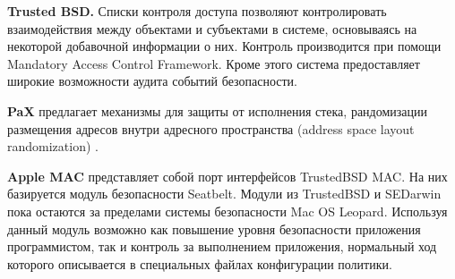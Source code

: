 \bigskip
{\bfseries Trusted BSD.} Списки контроля доступа позволяют 
контролировать взаимодействия между объектами и субъектами
в системе, основываясь на некоторой добавочной информации 
о них. Контроль производится при помощи Mandatory Access 
Control Framework. Кроме этого система предоставляет широкие 
возможности аудита событий безопасности. 

\bigskip
{\bfseries PaX} предлагает механизмы для защиты от 
исполнения стека, рандомизации размещения адресов внутри 
адресного пространства (address space layout randomization) . 

\bigskip
{\bfseries Apple MAC} представляет собой порт интерфейсов 
TrustedBSD MAC. На них базируется модуль безопасности 
Seatbelt. Модули из TrustedBSD и SEDarwin пока остаются 
за пределами системы безопасности Mac OS Leopard. Используя 
данный модуль возможно как повышение уровня безопасности 
приложения программистом, так и контроль за выполнением 
приложения, нормальный ход которого описывается в 
специальных файлах конфигурации политики.

